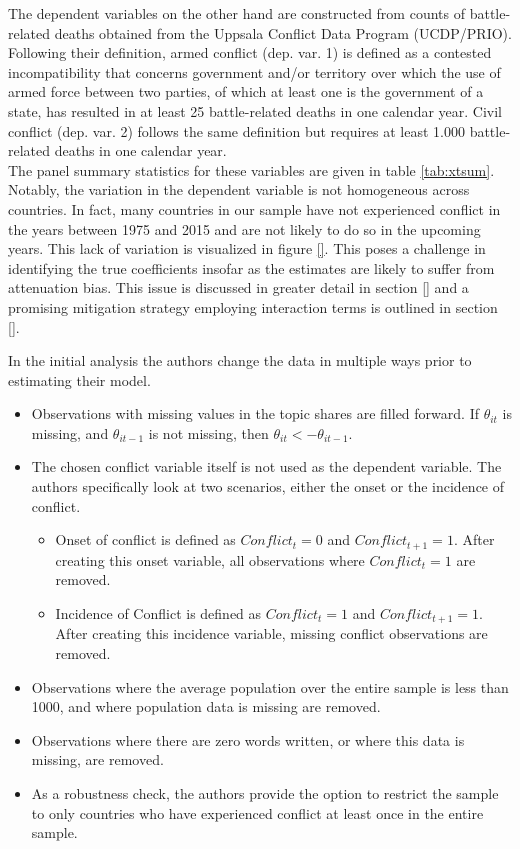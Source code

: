 The dependent variables on the other hand are constructed from counts of battle-related deaths obtained from the Uppsala Conflict Data Program (UCDP/PRIO).
Following their definition, armed conflict (dep. var. 1) is defined as a contested incompatibility that concerns government and/or territory over which the use of armed force between two parties, of which at least one is the government of a state, has resulted in at least 25 battle-related deaths in one calendar year.
Civil conflict (dep. var. 2) follows the same definition but requires at least 1.000 battle-related deaths in one calendar year. \\

The panel summary statistics for these variables are given in table \ref{tab:xtsum}.
Notably, the variation in the dependent variable is not homogeneous across countries.
In fact, many countries in our sample have not experienced conflict in the years between 1975 and 2015 and are not likely to do so in the upcoming years.
This lack of variation is visualized in figure \ref{}.
This poses a challenge in identifying the true coefficients insofar as the estimates are likely to suffer from attenuation bias.
This issue is discussed in greater detail in section \ref{} and a promising mitigation strategy employing interaction terms is outlined in section \ref{}.

In the initial analysis the authors change the data in multiple ways prior to estimating their model.

\begin{itemize}
    \item Observations with missing values in the topic shares are filled forward.
    If $\theta_{it}$ is missing, and $\theta_{it - 1}$ is not missing, then $\theta_{it} <- \theta_{it - 1}.$
    \item The chosen conflict variable itself is not used as the dependent variable.
    The authors specifically look at two scenarios, either the onset or the incidence of conflict.
        \begin{itemize}
            \item Onset of conflict is defined as $Conflict_{t} = 0$ and $Conflict_{t + 1} = 1$. After creating this onset variable, all observations where $Conflict_{t} = 1$ are removed.
            \item Incidence of Conflict is defined as $Conflict_{t} = 1$ and $Conflict_{t + 1} = 1$. After creating this incidence variable, missing conflict observations are removed.
        \end{itemize}
    \item Observations where the average population over the entire sample is less than 1000, and where population data is missing are removed.
    \item Observations where there are zero words written, or where this data is missing, are removed.
    \item As a robustness check, the authors provide the option to restrict the sample to only countries who have experienced conflict at least once in the entire sample.
\end{itemize}

